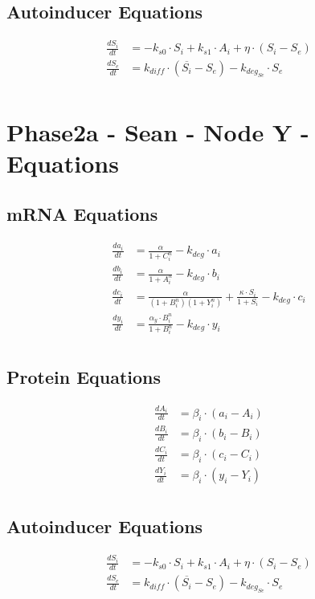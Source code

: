 \documentclass[fleqn]{article}
\begin{document}
\subsection*{Autoinducer Equations}
\begin{align*}
\frac{dS_i}{dt} &= -k_{s0} \cdot S_i + k_{s1} \cdot A_i + \eta \cdot (S_i - S_e) \\
\frac{dS_e}{dt} &= k_{diff} \cdot (\overline{S_i} - S_e) - k_{deg_{Se}} \cdot S_e \\
\end{align*}

\pagebreak

\section*{Phase2a - Sean - Node Y - Equations}

\subsection*{mRNA Equations}
\begin{align*}
\frac{da_i}{dt} &= \frac{\alpha}{1 + C_i^n} - k_{deg} \cdot a_i \\
\frac{db_i}{dt} &= \frac{\alpha}{1 + A_i^n} - k_{deg} \cdot b_i \\
\frac{dc_i}{dt} &= \frac{\alpha}{(1 + B_i^n)(1 + Y_i^n)} + \frac{\kappa \cdot S_i}{1 + S_i} - k_{deg} \cdot c_i \\
\frac{dy_i}{dt} &= \frac{\alpha_y \cdot B_i^n}{1 + B_i^n} - k_{deg} \cdot y_i \\
\end{align*}

\subsection*{Protein Equations}
\begin{align*}
\frac{dA_i}{dt} &= \beta_i \cdot (a_i - A_i) \\
\frac{dB_i}{dt} &= \beta_i \cdot (b_i - B_i) \\
\frac{dC_i}{dt} &= \beta_i \cdot (c_i - C_i) \\
\frac{dY_i}{dt} &= \beta_i \cdot (y_i - Y_i) \\
\end{align*}

\subsection*{Autoinducer Equations}
\begin{align*}
\frac{dS_i}{dt} &= -k_{s0} \cdot S_i + k_{s1} \cdot A_i + \eta \cdot (S_i - S_e) \\
\frac{dS_e}{dt} &= k_{diff} \cdot (\overline{S_i} - S_e) - k_{deg_{Se}} \cdot S_e \\
\end{align*}
\end{document}
